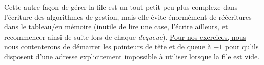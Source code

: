 \documentclass[11pt,a4paper]{article}
\begin{document}
\bigskip

Cette autre façon de gérer la file est un tout petit peu plus complexe dans l'écriture des algorithmes de gestion, mais elle évite énormément de réécritures dans le tableau/en mémoire (inutile de lire une case, l'écrire ailleurs, et recommencer ainsi de suite lors de chaque \textit{dequeue}).
\linebreak
\underline{Pour nos exercices, nous nous contenterons de démarrer les pointeurs de tête et de queue à $ -1 $ pour}
\linebreak
\underline{qu'ils disposent d'une adresse explicitement impossible à utiliser lorsque la file est vide.}


\bigskip

\end{document}
